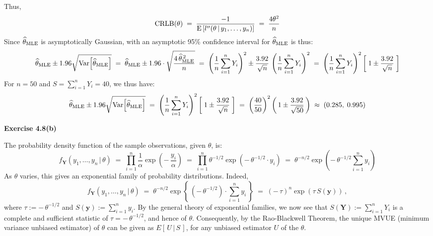 Thus,
\begin{equation*}
\textnormal{CRLB}(\theta)
\;=\; \dfrac{-1}{\textnormal{E}\left[l^{\prime\prime}(\theta\,\vert\,y_{1},\ldots,y_{n})\right]} 
\;=\; \dfrac{4\theta^{2}}{n}
\end{equation*}
Since $\widehat{\theta}_{\textnormal{MLE}}$ is asymptotically Gaussian, with an asymptotic 95\% confidence interval
for $\widehat{\theta}_{\textnormal{MLE}}$ is thus:
\begin{equation*}
\widehat{\theta}_{\textnormal{MLE}} \pm 1.96 \sqrt{\textnormal{Var}\!\left[\widehat{\theta}_{\textnormal{MLE}}\right]}
\;=\; \widehat{\theta}_{\textnormal{MLE}} \pm 1.96\cdot\sqrt{\frac{4\,\widehat{\theta}_{\textnormal{MLE}}^{\,2}}{n}}
\;=\; \left(\dfrac{1}{n}\sum_{i=1}^{n}Y_{i}\right)^{2} \pm \dfrac{3.92}{\sqrt{n}}\,\left(\dfrac{1}{n}\sum_{i=1}^{n}Y_{i}\right)^{2}
\;=\; \left(\dfrac{1}{n}\sum_{i=1}^{n}Y_{i}\right)^{2}\left[\;1 \pm \dfrac{3.92}{\sqrt{n}} \;\right]
\end{equation*}
For $n = 50$ and $S = \sum^{n}_{i=1}Y_{i} = 40$, we thus have:
\begin{equation*}
\widehat{\theta}_{\textnormal{MLE}} \pm 1.96 \sqrt{\textnormal{Var}\!\left[\widehat{\theta}_{\textnormal{MLE}}\right]}
\;=\; \left(\dfrac{1}{n}\sum_{i=1}^{n}Y_{i}\right)^{2}\left[\;1 \pm \dfrac{3.92}{\sqrt{n}}\;\right]
\;=\; \left(\dfrac{40}{50}\right)^{2} \left(\, 1 \pm \dfrac{3.92}{\sqrt{50}} \,\right)
\;\approx\; (0.285,\;0.995)
\end{equation*}

\clearpage
\noindent
\textbf{Exercise 4.8(b)}

\vskip 0.3cm
\noindent
The probability density function of the sample observations, given $\theta$, is:
\begin{equation*}
f_{\mathbf{Y}}(y_{1},\ldots,y_{n}\,\vert\,\theta)
\;=\;\prod_{i=1}^{n}\dfrac{1}{\alpha}\exp\left(-\,\dfrac{y_{i}}{\alpha}\right)
\;=\;\prod_{i=1}^{n}\theta^{-1/2}\exp\left(-\,\theta^{-1/2}\cdot y_{i}\right)
\;=\;\theta^{-n/2}\exp\left(-\,\theta^{-1/2}\sum_{i=1}^{n}y_{i}\right)
\end{equation*}
As $\theta$ varies, this gives an exponential family of probability distributions.
Indeed,
\begin{equation*}
f_{\mathbf{Y}}(y_{1},\ldots,y_{n}\,\vert\,\theta)
\;=\;\theta^{-n/2}\exp\left\{\,(-\,\theta^{-1/2})\cdot\sum_{i=1}^{n}y_{i}\,\right\}
\;=\;(-\,\tau)^{n}\exp\left(\tau\,S(\mathbf{y})\right)\,,
\end{equation*}
where $\tau := -\,\theta^{-1/2}$ and $S(\mathbf{y}) := \sum_{i=1}^{n}y_{i}$.
By the general theory of exponential families, we now see that
$S(\mathbf{Y}) := \sum_{i=1}^{n}Y_{i}$ is a complete and sufficient statistic
of $\tau = -\,\theta^{-1/2}$, and hence of $\theta$.
Consequently, by the Rao-Blackwell Theorem, the unique MVUE (minimum variance unbiased estimator)
of $\theta$ can be given as $E\left[\,U\,\vert\,S\,\right]$, for any unbiased estimator $U$ of the $\theta$.

